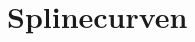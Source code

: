 \documentclass[computergesteund_ontwerp_van_curven_en_oppervlakken.tex]{subfiles}
\begin{document}
\chapter{Splinecurven}
\end{document}
